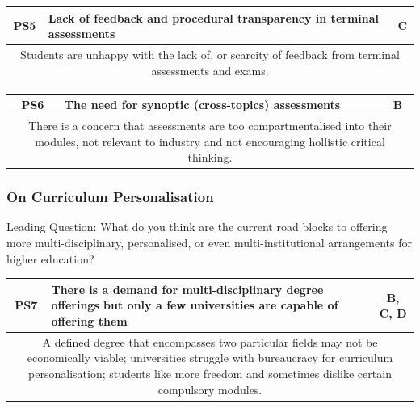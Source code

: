 \begin{table}[!ht]
	\begin{tabularx}{\textwidth}{|c|X|c|}
		\hline
		PS5 & \textbf{Lack of feedback and procedural transparency in terminal assessments} & C \\
		\hline
		\multicolumn{3}{|X|}{Students are unhappy with the lack of, or scarcity of feedback
			from terminal assessments and exams.}                                                   \\
		\hline
	\end{tabularx}
\end{table}

\begin{table}[!ht]
	\begin{tabularx}{\textwidth}{|c|X|c|}
		\hline
		PS6 & \textbf{The need for synoptic (cross-topics) assessments} & B \\
		\hline
		\multicolumn{3}{|X|}{There is a concern that assessments are too
			compartmentalised into their modules, not relevant to industry and not encouraging
			hollistic critical thinking.}                                       \\
		\hline
	\end{tabularx}
\end{table}

\subsubsection{On Curriculum Personalisation}

Leading Question: What do you think are the current road blocks to offering more multi-disciplinary, 
personalised, or even multi-institutional arrangements for higher education?

\begin{table}[!ht]
	\begin{tabularx}{\textwidth}{|c|X|c|}
		\hline
		PS7 & \textbf{There is a demand for multi-disciplinary degree offerings but only a few 
        universities are capable of offering them} & B, C, D \\
		\hline
        \multicolumn{3}{|X|}{A defined degree that encompasses two particular fields may not be economically viable; 
        universities struggle with bureaucracy for curriculum personalisation;
        students like more freedom and sometimes dislike certain compulsory modules.}                                       \\
		\hline
	\end{tabularx}
\end{table}

